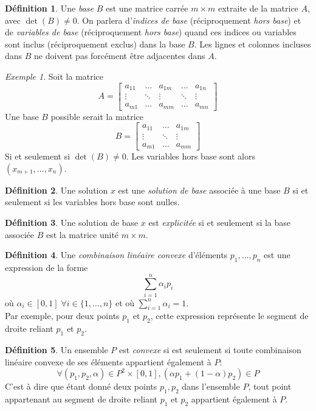 \documentclass[a4paper]{report}
\theoremstyle{definition}
\newtheorem*{definition}{Définition}
\theoremstyle{remark}
\newtheorem*{example}{Exemple}
\theoremstyle{plain}
\begin{document}
\begin{definition}
Une \emph{base} \(B\) est une matrice carrée \(m\times
m\) extraite de la matrice \(A\), avec \(\det(B)\ne 0\). On parlera
d'\emph{indices de base} (réciproquement \emph{hors base}) et de \emph{variables
de base} (réciproquement \emph{hors base}) quand ces indices ou variables sont
inclus (réciproquement exclus) dans la base \(B\). Les lignes et colonnes
incluses dans \(B\) ne doivent pas forcément être adjacentes dans \(A\).
\begin{example}
Soit la matrice
\[A=\begin{bmatrix}
	a_{11} & \dots  & a_{1m} & \dots  & a_{1n} \\
	\vdots & \ddots & \vdots & \ddots & \vdots \\
	a_{m1} & \dots  & a_{mm} & \dots  & a_{mn}
\end{bmatrix}\]
Une base \(B\) possible serait la matrice
\[B=\begin{bmatrix}
	a_{11} & \dots  & a_{1m} \\
	\vdots & \ddots & \vdots \\
	a_{m1} & \dots  & a_{mm}
\end{bmatrix}\]
Si et seulement si \(\det(B)\neq 0\). Les variables hors base sont alors
\((x_{m+1},\dots,x_{n})\).
\end{example}
\end{definition}

\begin{definition}
Une solution \(x\) est une \emph{solution de base}
associée à une base \(B\) si et seulement si les variables hors base sont
nulles.
\end{definition}

\begin{definition}
Une solution de base \(x\) est \emph{explicitée} si et
seulement si la base associée \(B\) est la matrice unité \(m\times m\).
\end{definition}

\begin{definition}
Une \emph{combinaison linéaire convexe} d'éléments \(p_1,\dots,p_n\) est
une expression de la forme \[\sum_{i=1}^n\alpha_ip_i\] où \(\alpha_i\in[0,1]
\;\forall i\in\{1,\dots,n\}\) et où \(\sum_{i=1}^n\alpha_i=1\). \\
Par exemple, pour deux points \(p_1\) et \(p_2\), cette expression représente le
segment de droite reliant \(p_1\) et \(p_2\).
\end{definition}

\begin{definition}
Un ensemble \(P\) est \emph{convexe} si est seulement si toute combinaison
linéaire convexe de ses éléments appartient également à \(P\):
\[\forall (p_1,p_2,\alpha)\in P^2\times[0,1],(\alpha p_1+(1-\alpha)p_2)\in P\]
C'est à dire que étant donné deux points \(p_1,p_2\) dans l'ensemble \(P\),
tout point appartenant au segment de droite reliant \(p_1\) et \(p_2\)
appartient également à \(P\).
\end{definition}
\end{document}
